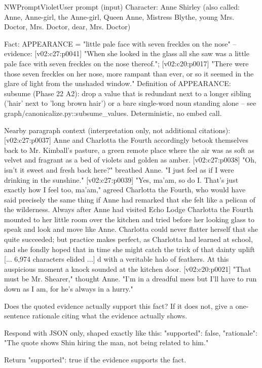 \begin{nwprompt}{NWPromptViolet}{User prompt (input)}
Character: Anne Shirley (also called: Anne, Anne-girl, the Anne-girl, Queen Anne, Mistress Blythe, young Mrs. Doctor, Mrs. Doctor, dear, Mrs. Doctor)

Fact: APPEARANCE = "little pale face with seven freckles on the nose" -- evidence: [v02:c27:p0041] "When she looked in the glass all she saw was a little pale face with seven freckles on the nose thereof."; [v02:c20:p0017] "There were those seven freckles on her nose, more rampant than ever, or so it seemed in the glare of light from the unshaded window."
Definition of APPEARANCE: subsume (Phase 22 A2): drop a value that is redundant next to a longer sibling ('hair' next to 'long brown hair') or a bare single-word noun standing alone -- see graph/canonicalize.py::subsume_values. Deterministic, no embed call.

Nearby paragraph context (interpretation only, not additional citations):
[v02:c27:p0037] Anne and Charlotta the Fourth accordingly betook themselves back to Mr. Kimball's pasture, a green remote place where the air was as soft as velvet and fragrant as a bed of violets and golden as amber.
[v02:c27:p0038] "Oh, isn't it sweet and fresh back here?" breathed Anne. "I just feel as if I were drinking in the sunshine."
[v02:c27:p0039] "Yes, ma'am, so do I. That's just exactly how I feel too, ma'am," agreed Charlotta the Fourth, who would have said precisely the same thing if Anne had remarked that she felt like a pelican of the wilderness. Always after Anne had visited Echo Lodge Charlotta the Fourth mounted to her little room over the kitchen and tried before her looking glass to speak and look and move like Anne. Charlotta could never flatter herself that she quite succeeded; but practice makes perfect, as Charlotta had learned at school, and she fondly hoped that in time she might catch the trick of that dainty uplift 
[... 6,974 characters elided ...]
d with a veritable halo of feathers. At this auspicious moment a knock sounded at the kitchen door.
[v02:c20:p0021] "That must be Mr. Shearer," thought Anne. "I'm in a dreadful mess but I'll have to run down as I am, for he's always in a hurry."

Does the quoted evidence actually support this fact? If it does not, give a one-sentence rationale citing what the evidence actually shows.

Respond with JSON only, shaped exactly like this:
{"supported": false, "rationale": "The quote shows Shin hiring the man, not being related to him."}

Return {"supported": true} if the evidence supports the fact.
\end{nwprompt}

